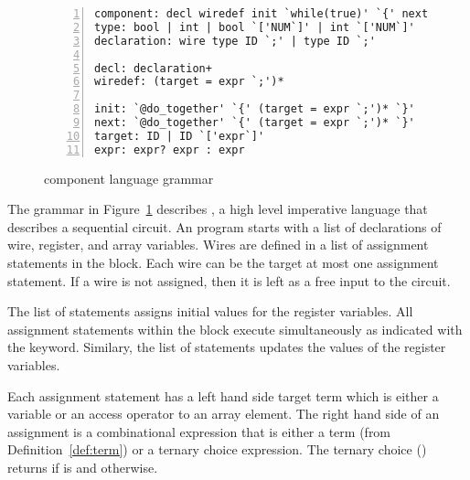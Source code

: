 \begin{figure}[tb]
\centering
\begin{Verbatim}[fontsize=\relsize{-2.5}, numbersep=4pt,numbers=left]
component: decl wiredef init `while(true)' `{' next `}'
type: bool | int | bool `['NUM`]' | int `['NUM`]'
declaration: wire type ID `;' | type ID `;'

decl: declaration+
wiredef: (target = expr `;')*

init: `@do_together' `{' (target = expr `;')* `}'
next: `@do_together' `{' (target = expr `;')* `}'
target: ID | ID `['expr`]'
expr: expr? expr : expr
\end{Verbatim}
\caption{\thislanguage component language grammar}
\label{fig:etcircuit}
\end{figure}

The grammar in Figure~\ref{fig:etcircuit} describes \thislanguage, a high level
imperative language that describes a sequential circuit.
An \thislanguage program starts with a list of declarations of wire, register,
and array variables. Wires are defined in a list of assignment statements
in the  block.
Each wire can be the target at most one assignment statement. If a wire is not 
assigned, then it is left as a free input to the circuit. 

The  list of statements assigns initial values for the register variables.
All assignment statements within the  block execute simultaneously as
indicated with the  keyword. 
Similary, the  list of statements updates the values of the register variables. 

Each assignment statement has a left hand side target term which is either a variable or 
an access operator to an array element. The right hand side of an assignment is a combinational
expression that is either a term (from Definition~\ref{def:term}) or a ternary choice
expression. The ternary choice () returns  if  is 
and  otherwise. 